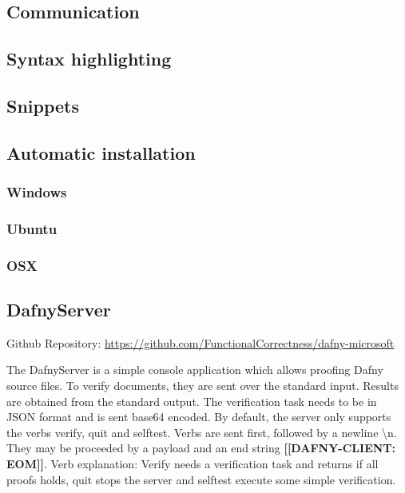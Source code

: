 \subsection{Communication}

\subsection{Syntax highlighting}

\subsection{Snippets}

\subsection{Automatic installation}
\subsubsection{Windows}

\subsubsection{Ubuntu}

\subsubsection{OSX}


\subsection{DafnyServer}
Github Repository: \href{https://github.com/FunctionalCorrectness/dafny-microsoft}{https://github.com/FunctionalCorrectness/dafny-microsoft}

The DafnyServer is a simple console application which allows proofing Dafny source files. To verify documents, they are sent over the standard input. Results are obtained from the standard output. The verification task needs to be in JSON format  and is sent base64 encoded. By default, the server only supports the verbs verify, quit and selftest. Verbs are sent first, followed by a newline \textbackslash{n}. They may be proceeded by a payload and an end string \textbf{[[DAFNY-CLIENT: EOM]]}. \newline 
Verb explanation: Verify needs a verification task and returns if all proofs holds, quit stops the server and selftest execute some simple verification. \newline

